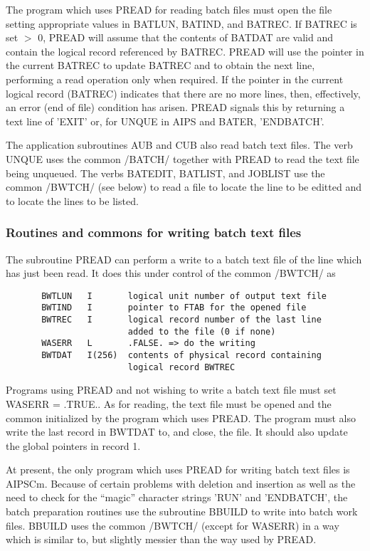 The program which uses PREAD for reading batch files must open the
file setting appropriate values in BATLUN, BATIND, and BATREC.  If
BATREC is set $>$ 0, PREAD will assume that the contents of BATDAT are
valid and contain the logical record referenced by BATREC.  PREAD will
use the pointer in the current BATREC to update BATREC and to obtain
the next line, performing a read operation only when required.  If the
pointer in the current logical record (BATREC) indicates that there
are no more lines, then, effectively, an error (end of file) condition
has arisen.  PREAD signals this by returning a text line of 'EXIT' or,
for UNQUE in AIPS and BATER, 'ENDBATCH'.

     The application subroutines AUB and CUB also read batch text
files.  The verb UNQUE uses the common /BATCH/ together with PREAD
to read the text file being unqueued.  The verbs BATEDIT, BATLIST,
and JOBLIST use the common /BWTCH/ (see below) to read a file to
locate the line to be editted and to locate the lines to be listed.

\subsubsection{Routines and commons for writing batch text files}


     The subroutine PREAD can perform a write to a batch text file of
the line which has just been read.  It does this under control of the
common /BWTCH/ as
\begin{verbatim}
       BWTLUN   I       logical unit number of output text file
       BWTIND   I       pointer to FTAB for the opened file
       BWTREC   I       logical record number of the last line
                        added to the file (0 if none)
       WASERR   L       .FALSE. => do the writing
       BWTDAT   I(256)  contents of physical record containing
                        logical record BWTREC
\end{verbatim}

Programs using PREAD and not wishing to write a batch text file must
set WASERR = .TRUE..  As for reading, the text file must be opened and
the common initialized by the program which uses PREAD.  The program
must also write the last record in BWTDAT to, and close, the file.
It should also update the global pointers in record 1.

     At present, the only program which uses PREAD for writing batch
text files is AIPSCm.  Because of certain problems with deletion and
insertion as well as the need to check for the ``magic'' character
strings 'RUN' and 'ENDBATCH', the batch preparation routines use the
subroutine BBUILD to write into batch work files.  BBUILD uses the
common /BWTCH/ (except for WASERR) in a way which is similar to, but
slightly messier than the way used by PREAD.

